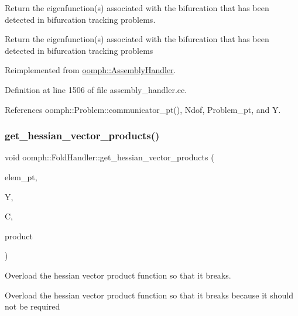 Return the eigenfunction(s) associated with the bifurcation that has been detected in bifurcation tracking problems. 

Return the eigenfunction(s) associated with the bifurcation that has been detected in bifurcation tracking problems 

Reimplemented from \hyperlink{classoomph_1_1AssemblyHandler_a6d614b1b3809d0eb7ceb393e3ae9594f}{oomph\+::\+Assembly\+Handler}.



Definition at line 1506 of file assembly\+\_\+handler.\+cc.



References oomph\+::\+Problem\+::communicator\+\_\+pt(), Ndof, Problem\+\_\+pt, and Y.

\mbox{\label{classoomph_1_1FoldHandler_aa633b80f1ebdb322350c6832fe6c2b6c}} 
\subsubsection{\texorpdfstring{get\+\_\+hessian\+\_\+vector\+\_\+products()}{get\_hessian\_vector\_products()}}
{\footnotesize\ttfamily void oomph\+::\+Fold\+Handler\+::get\+\_\+hessian\+\_\+vector\+\_\+products (\begin{DoxyParamCaption}\item[{\hyperlink{classoomph_1_1GeneralisedElement}{Generalised\+Element} $\ast$const \&}]{elem\+\_\+pt,  }\item[{\hyperlink{classoomph_1_1Vector}{Vector}$<$ double $>$ const \&}]{Y,  }\item[{\hyperlink{classoomph_1_1DenseMatrix}{Dense\+Matrix}$<$ double $>$ const \&}]{C,  }\item[{\hyperlink{classoomph_1_1DenseMatrix}{Dense\+Matrix}$<$ double $>$ \&}]{product }\end{DoxyParamCaption})\hspace{0.3cm}{\ttfamily [virtual]}}



Overload the hessian vector product function so that it breaks. 

Overload the hessian vector product function so that it breaks because it should not be required 

